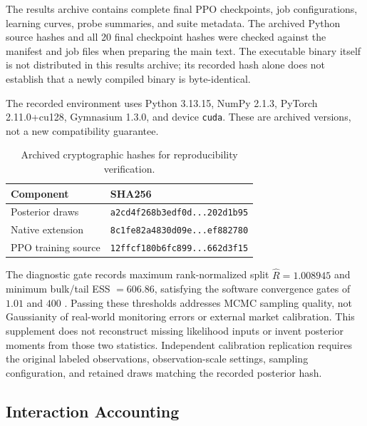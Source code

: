 \documentclass{article}
\begin{document}
The results archive contains complete final PPO checkpoints, job configurations, learning curves, probe summaries, and suite metadata. The archived Python source hashes and all 20 final checkpoint hashes were checked against the manifest and job files when preparing the main text. The executable binary itself is not distributed in this results archive; its recorded hash alone does not establish that a newly compiled binary is byte-identical.

The recorded environment uses Python 3.13.15, NumPy 2.1.3, PyTorch 2.11.0+cu128, Gymnasium 1.3.0, and device \texttt{cuda}. These are archived versions, not a new compatibility guarantee.

\begin{table}[t]
\centering
\caption{Archived cryptographic hashes for reproducibility verification.}
\label{tab:hashes}
\small
\begin{tabular}{@{}ll@{}}
\toprule
Component & SHA256 \\
\midrule
Posterior draws & \texttt{a2cd4f268b3edf0d...202d1b95} \\
Native extension & \texttt{8c1fe82a4830d09e...ef882780} \\
PPO training source & \texttt{12ffcf180b6fc899...662d3f15} \\
\bottomrule
\end{tabular}
\end{table}

The diagnostic gate records maximum rank-normalized split $\hat{R} = 1.008945$ and minimum bulk/tail ESS $= 606.86$, satisfying the software convergence gates of $1.01$ and $400$ \citep{vehtari2021rank}. Passing these thresholds addresses MCMC sampling quality, not Gaussianity of real-world monitoring errors or external market calibration. This supplement does not reconstruct missing likelihood inputs or invent posterior moments from those two statistics. Independent calibration replication requires the original labeled observations, observation-scale settings, sampling configuration, and retained draws matching the recorded posterior hash.

\subsection{Interaction Accounting}
\end{document}
